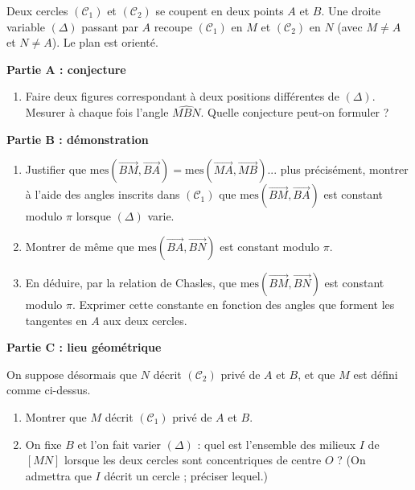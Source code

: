 \documentclass[11pt]{article}
\begin{document}
\begin{exercice}
Deux cercles $(\mathcal{C}_1)$ et $(\mathcal{C}_2)$ se coupent en deux points $A$ et $B$. Une droite variable $(\Delta)$ passant par $A$ recoupe $(\mathcal{C}_1)$ en $M$ et $(\mathcal{C}_2)$ en $N$ (avec $M \neq A$ et $N \neq A$). Le plan est orienté.

\textbf{Partie A : conjecture}
\begin{enumerate}
\item Faire deux figures correspondant à deux positions différentes de $(\Delta)$. Mesurer à chaque fois l'angle $\widehat{MBN}$. Quelle conjecture peut-on formuler ?
\end{enumerate}

\textbf{Partie B : démonstration}
\begin{enumerate}
\item Justifier que $\mathrm{mes}(\overrightarrow{BM}, \overrightarrow{BA}) = \mathrm{mes}(\overrightarrow{MA}, \overrightarrow{MB})$... plus précisément, montrer à l'aide des angles inscrits dans $(\mathcal{C}_1)$ que $\mathrm{mes}(\overrightarrow{BM}, \overrightarrow{BA})$ est constant modulo $\pi$ lorsque $(\Delta)$ varie.
\item Montrer de même que $\mathrm{mes}(\overrightarrow{BA}, \overrightarrow{BN})$ est constant modulo $\pi$.
\item En déduire, par la relation de Chasles, que $\mathrm{mes}(\overrightarrow{BM}, \overrightarrow{BN})$ est constant modulo $\pi$. Exprimer cette constante en fonction des angles que forment les tangentes en $A$ aux deux cercles.
\end{enumerate}

\textbf{Partie C : lieu géométrique}

On suppose désormais que $N$ décrit $(\mathcal{C}_2)$ privé de $A$ et $B$, et que $M$ est défini comme ci-dessus.
\begin{enumerate}
\item Montrer que $M$ décrit $(\mathcal{C}_1)$ privé de $A$ et $B$.
\item On fixe $B$ et l'on fait varier $(\Delta)$ : quel est l'ensemble des milieux $I$ de $[MN]$ lorsque les deux cercles sont concentriques de centre $O$ ? (On admettra que $I$ décrit un cercle ; préciser lequel.)
\end{enumerate}
\end{exercice}
\end{document}
